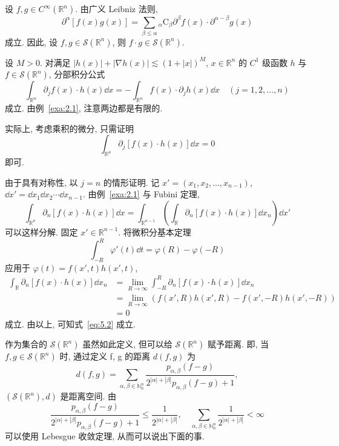 \begin{example}\label{exa:5.3}
设 $f, g \in C^{\infty}(\mathbb{R}^{n})$. 由广义 Leibniz 法则,
\[
\partial^{\alpha}[f(x)g(x)] = \sum_{\beta \leq \alpha}{}_{\alpha}\mathrm{C}_{\beta}\partial^{\beta}f(x) \cdot \partial^{\alpha-\beta}g(x)
\]
成立. 因此, 设 $f, g \in \mathcal{S}(\mathbb{R}^{n})$, 则 $f \cdot g \in \mathcal{S}(\mathbb{R}^{n})$.
\end{example}

\begin{example}\label{exa:5.4}
设 $M > 0$. 对满足 $|h(x)| + |\nabla h(x)| \lesssim (1+|x|)^{M}$, $x \in \mathbb{R}^{n}$ 的 $C^{1}$ 级函数 $h$ 与 $f \in \mathcal{S}(\mathbb{R}^{n})$, 分部积分公式
\[
\int_{\mathbb{R}^{n}}\partial_{j}f(x) \cdot h(x)\dd x = -\int_{\mathbb{R}^{n}}f(x) \cdot \partial_{j}h(x)\dd x \quad (j = 1, 2, \ldots, n)
\]
成立. 由例~\ref{exa:2.1}, 注意两边都是有限的.

实际上, 考虑乘积的微分, 只需证明
\begin{equation}\tag{5.2}
\int_{\mathbb{R}^{n}}\partial_{j}[f(x) \cdot h(x)]\dd x = 0
\label{eq:5.2}
\end{equation}
即可.

由于具有对称性, 以 $j = n$ 的情形证明. 记 $x' = (x_{1}, x_{2}, \ldots, x_{n-1})$, $\dd x' = \dd x_{1}\dd x_{2}\cdots\dd x_{n-1}$. 由例~\ref{exa:2.1} 与 Fubini 定理,
\[
\int_{\mathbb{R}^{n}}\partial_{n}[f(x) \cdot h(x)]\dd x = \int_{\mathbb{R}^{n-1}}\left(\int_{\mathbb{R}}\partial_{n}[f(x) \cdot h(x)]\dd x_{n}\right)\dd x'
\]
可以这样分解. 固定 $x' \in \mathbb{R}^{n-1}$. 将微积分基本定理
\[
\int_{-R}^{R}\varphi'(t)\dd t = \varphi(R) - \varphi(-R)
\]
应用于 $\varphi(t) = f(x', t)h(x', t)$,
\begin{align*}
\int_{\mathbb{R}}\partial_{n}[f(x) \cdot h(x)]\dd x_{n} &= \lim_{R \to \infty}\int_{-R}^{R}\partial_{n}[f(x) \cdot h(x)]\dd x_{n} \\
&= \lim_{R \to \infty}(f(x', R)h(x', R) - f(x', -R)h(x', -R)) \\
&= 0
\end{align*}
成立. 由以上, 可知式~\eqref{eq:5.2} 成立.
\end{example}

作为集合的 $\mathcal{S}(\mathbb{R}^{n})$ 虽然如此定义, 但可以给 $\mathcal{S}(\mathbb{R}^{n})$ 赋予距离. 即, 当 $f, g \in \mathcal{S}(\mathbb{R}^{n})$ 时, 通过定义 f, g 的距离 $d(f, g)$ 为
\[
d(f, g) = \sum_{\alpha, \beta \in \mathbb{N}_{0}^{n}}\frac{p_{\alpha,\beta}(f-g)}{2^{|\alpha|+|\beta|}p_{\alpha,\beta}(f-g)+1},
\]
$(\mathcal{S}(\mathbb{R}^{n}), d)$ 是距离空间. 由
\[
\frac{p_{\alpha,\beta}(f-g)}{2^{|\alpha|+|\beta|}p_{\alpha,\beta}(f-g)+1} \leq \frac{1}{2^{|\alpha|+|\beta|}}, \quad \sum_{\alpha, \beta \in \mathbb{N}_{0}^{n}}\frac{1}{2^{|\alpha|+|\beta|}} < \infty
\]
可以使用 Lebesgue 收敛定理, 从而可以说出下面的事.

